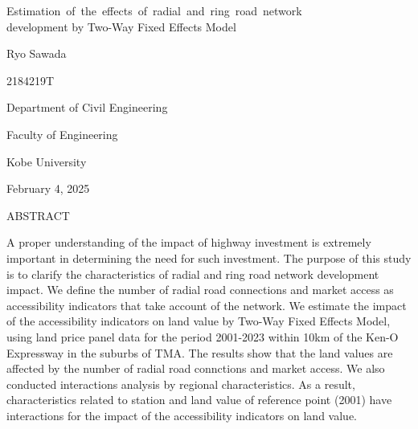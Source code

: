 \newpage

\begin{center}

{\LARGE 
\textsf{
\mbox{Estimation of the effects of radial and ring road network  }\\
\vspace{0.3cm}
development by Two-Way Fixed Effects Model }}



\vspace{12mm}
Ryo Sawada

\vspace{0.5mm}
2184219T

\vspace{0.5mm}
Department of Civil Engineering
 
Faculty of Engineering

Kobe University
 
 \vspace{5mm}

February 4, 2025

\vspace{15mm}
\textsf{ABSTRACT}
\end{center}
 \vspace{6mm}
 
A proper understanding of the impact of highway investment is extremely important in determining the need for such investment. The purpose of this study is to clarify the characteristics of radial and ring road network development impact. We define the number of radial road connections and market access as accessibility indicators that take account of the network. We estimate the impact of the accessibility indicators on land value by Two-Way Fixed Effects Model, using land price panel data for the period  2001-2023 within 10km of the Ken-O Expressway in the suburbs of TMA. The results show that the land values are affected by the number of radial road connctions and market access. We also conducted interactions analysis by regional characteristics. As a result, characteristics related to station and land value of reference point (2001) have interactions for the impact of the accessibility indicators on land value.